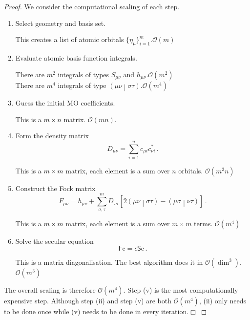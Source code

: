 \documentclass{article}
\theoremstyle{plain}\theoremheaderfont{\normalfont\itshape}\theorembodyfont{\rmfamily}\theoremseparator{.}\newtheorem*{rem}{Remark}\newtheorem*{ex}{Example}\newtheorem*{proof}{Proof}\newtheorem*{altp}{Alternative proof}
\theoremstyle{plain}\theoremheaderfont{\normalfont\bfseries}\theorembodyfont{\rmfamily}\theoremseparator{.}\newtheorem{thm}{Theorem}[section]\newtheorem{lem}[thm]{Lemma}\newtheorem{prop}[thm]{Proposition}\newtheorem*{cor}{Corollary}\newtheorem{defn}[thm]{Definition}\newtheorem{clm}[thm]{Claim}\newtheorem{clminproof}{Claim}
\theoremstyle{break}\theoremheaderfont{\normalfont\itshape}\theorembodyfont{\rmfamily}\theoremseparator{.\medskip}\newtheorem*{proofskip}{Proof}\newtheorem*{exs}{Examples}\newtheorem*{rems}{Remarks}
\theoremstyle{break}\theoremheaderfont{\normalfont\bfseries}\theorembodyfont{\rmfamily}\theoremseparator{.\medskip}\newtheorem{lemskip}[thm]{Lemma}\newtheorem{defnskip}[thm]{Definition}\newtheorem{propskip}[thm]{Proposition}\newtheorem{thmskip}[thm]{Theorem}
\numberwithin{equation}{section}
\newcommand{\qed}{\hfill\ensuremath{\Box}}
\newcommand{\vb}[1]{\bm{\mathrm{#1}}}
\newcommand{\bracket}[2]{\left( #1 \middle| #2 \right)}
\begin{document}
    \begin{proof}
        We consider the computational scaling of each step.
        \begin{enumerate}[topsep=0pt,label=(\roman*)]
            \item Select geometry and basis set.
            
            This creates a list of atomic orbitals \(\{\eta_\mu\}_{i=1}^{m}\).\hfill \(\mathcal{O}(m)\)
            \item Evaluate atomic basis function integrals.
            
            There are \(m^2\) integrals of types \(S_{\mu\nu}\) and \(h_{\mu\nu}\).\hfill \(\mathcal{O}(m^2)\)\\
            There are \(m^4\) integrals of type \(\bracket{\mu\nu}{\sigma\tau}\).\hfill \(\mathcal{O}(m^4)\)
            \item Guess the initial MO coefficients.
            
            This is a \(m\times n\) matrix. \hfill \(\mathcal{O}(mn)\).
            \item Form the density matrix
            \begin{equation}
                D_{\mu\nu}=\sum_{i=1}^{n}c_{\mu i}c^*_{\nu i}\,.
            \end{equation}
            
            This is a \(m\times m\) matrix, each element is a sum over \(n\) orbitals. \hfill \(\mathcal{O}(m^2 n)\)
            \item Construct the Fock matrix
            \begin{equation}
                F_{\mu\nu}=h_{\mu\nu}+\sum_{\sigma,\tau}^{m}D_{\tau\sigma}[2\bracket{\mu\nu}{\sigma\tau}-\bracket{\mu\sigma}{\nu\tau}]\,.
            \end{equation}

            This is a \(m\times m\) matrix, each element is a sum over \(m\times m\) terms. \hfill \(\mathcal{O}(m^4)\)
            \item Solve the secular equation
            \begin{equation}
                \mathsf{F}\vb{c}=\epsilon\mathsf{S}\vb{c}\,.
            \end{equation}

            This is a matrix diagonalisation. The best algorithm does it in \(\mathcal{O}(\dim ^3)\). \hfill \(\mathcal{O}(m^3)\)
        \end{enumerate}
        The overall scaling is therefore \(\mathcal{O}(m^4)\). Step (v) is the most computationally expensive step. Although step (ii) and step (v) are both \(\mathcal{O}(m^4)\), (ii) only needs to be done once while (v) needs to be done in every iteration.\qed
    \end{proof}
\end{document}
